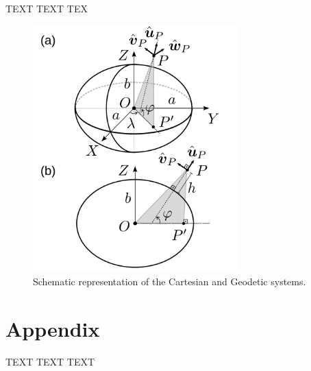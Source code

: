 \documentclass[mreferee]{gji}
\begin{document}
TEXT TEXT TEX

%
%

\clearpage


\begin{figure}
    \includegraphics[width=8cm]{figures/cartesian-geodetic-systems.png}%
    \caption{Schematic representation of the Cartesian and Geodetic systems.}
    \label{fig:cartesian-geodetic-systems}
\end{figure}








\appendix
\section{Appendix} \label{appendA}

TEXT TEXT TEXT
\end{document}
